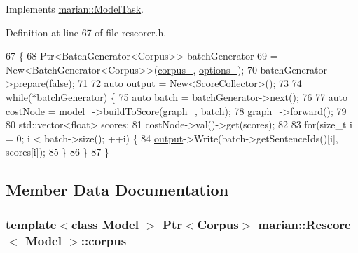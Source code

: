 Implements \hyperlink{structmarian_1_1ModelTask_a2f4fddd0f227555bf792e3c3d4bfdb0d}{marian\+::\+Model\+Task}.



Definition at line 67 of file rescorer.\+h.


\begin{DoxyCode}
67              \{
68     Ptr<BatchGenerator<Corpus>> batchGenerator
69         = New<BatchGenerator<Corpus>>(\hyperlink{classmarian_1_1Rescore_aa4c8b89fe7b567a755cd4511d374aafe}{corpus\_}, \hyperlink{classmarian_1_1Rescore_a364be87ce2541f28ca6065e12955f789}{options\_});
70     batchGenerator->prepare(\textcolor{keyword}{false});
71 
72     \textcolor{keyword}{auto} \hyperlink{namespacetest_a07b64f21658cf1faa97a31563ac979d2}{output} = New<ScoreCollector>();
73 
74     \textcolor{keywordflow}{while}(*batchGenerator) \{
75       \textcolor{keyword}{auto} batch = batchGenerator->next();
76 
77       \textcolor{keyword}{auto} costNode = \hyperlink{classmarian_1_1Rescore_a062b8a1e12c90dbc2b68a7321f8afb67}{model\_}->buildToScore(\hyperlink{classmarian_1_1Rescore_a9f6d908e2c46c0b43ca16e61d3c4a618}{graph\_}, batch);
78       \hyperlink{classmarian_1_1Rescore_a9f6d908e2c46c0b43ca16e61d3c4a618}{graph\_}->forward();
79 
80       std::vector<float> scores;
81       costNode->val()->get(scores);
82 
83       \textcolor{keywordflow}{for}(\textcolor{keywordtype}{size\_t} i = 0; i < batch->size(); ++i) \{
84         \hyperlink{namespacetest_a07b64f21658cf1faa97a31563ac979d2}{output}->Write(batch->getSentenceIds()[i], scores[i]);
85       \}
86     \}
87   \}
\end{DoxyCode}


\subsection{Member Data Documentation}
\subsubsection[{\texorpdfstring{corpus\+\_\+}{corpus_}}]{\setlength{\rightskip}{0pt plus 5cm}template$<$class Model $>$ {\bf Ptr}$<${\bf Corpus}$>$ {\bf marian\+::\+Rescore}$<$ Model $>$\+::corpus\+\_\+\hspace{0.3cm}{\ttfamily [private]}}\hypertarget{classmarian_1_1Rescore_aa4c8b89fe7b567a755cd4511d374aafe}{}\label{classmarian_1_1Rescore_aa4c8b89fe7b567a755cd4511d374aafe}


